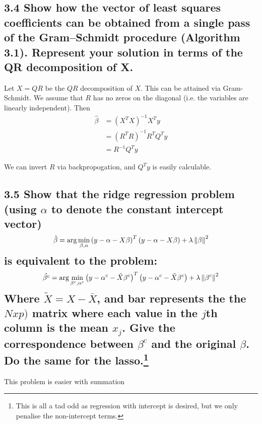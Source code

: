 \subsection*{ 3.4 Show how the vector of least squares coefficients can be obtained
from a single pass of the Gram–Schmidt procedure (Algorithm 3.1). Represent your solution in terms of the QR decomposition of X.}

Let $X = QR$ be the $QR$ decomposition of $X$. This can be attained via Gram-Schmidt. We assume that $R$ has no zeros on the diagonal (i.e. the variables are linearly independent).
Then 
\begin{align*}
    \hat{\beta} &= (X^T X)^{-1} X^T y \\
    &= (R^T R)^{-1} R^T Q^T y \\
    &= R^{-1} Q^T y
\end{align*}

We can invert $R$ via backpropogation, and $Q^T y$ is easily calculable.






\subsection*{3.5 Show that the ridge regression problem (using $\alpha$ to denote the constant intercept vector)
$$\hat{\beta} = \arg\min_{\beta,\alpha} \left(y - \alpha - X \beta\right)^T\left(y - \alpha - X \beta\right) + \lambda \left\lVert\beta\right\rVert^2 $$
is equivalent to the problem:
$$\hat{\beta^c} = \arg\min_{\beta^c, \alpha^c} \left(y - \alpha^c - \tilde{X} \beta^c\right)^T\left(y - \alpha^c - \tilde{X} \beta^c\right) + \lambda \left\lVert\beta^c\right\rVert^2 $$
Where $\tilde{X} = X - \bar{X}$, and bar represents the the $N x p)$ matrix where each value in the $j$th column is the mean $x_j$. Give the correspondence between $\beta^c$ and the original $\beta$. Do the same for the lasso.\footnote{
This is all a tad odd as regression with intercept is desired, but we only penalise the non-intercept terms.}}

This problem is easier with summation

